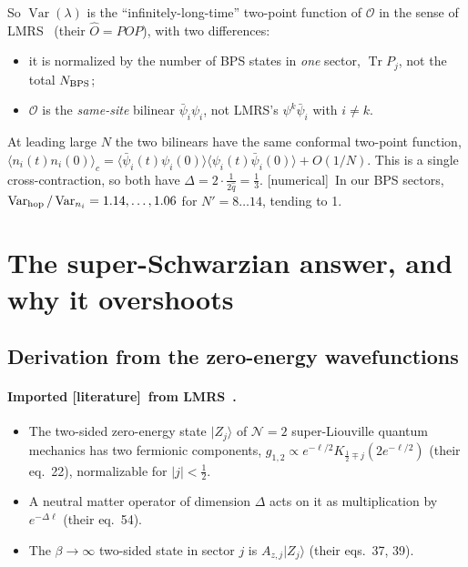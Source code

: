 \documentclass[11pt]{article}
\newcommand{\Tr}{\operatorname{Tr}}
\newcommand{\Var}{\operatorname{Var}}
\newcommand{\ket}[1]{\lvert #1\rangle}
\newcommand{\Np}{N'}
\newcommand{\tagbox}[2]{\textsf{\small\color{#1}[#2]}}
\newcommand{\EST}{\tagbox{cest}{literature}}
\newcommand{\NUM}{\tagbox{cnum}{numerical}}
\theoremstyle{remark}
\begin{document}
So $\Var(\lambda)$ is the ``infinitely-long-time'' two-point function of $\mathcal O$ in the sense of
LMRS~\cite{LMRS} (their $\hat O=POP$), with two differences:
\begin{itemize}\itemsep1pt
\item it is normalized by the number of BPS states in \emph{one} sector, $\Tr P_j$, not the total $N_{\rm BPS}$;
\item $\mathcal O$ is the \emph{same-site} bilinear $\bar\psi_i\psi_i$, not LMRS's $\psi^k\bar\psi_i$ with $i\neq k$.
\end{itemize}
At leading large $N$ the two bilinears have the same conformal two-point function,
$\langle n_i(t)n_i(0)\rangle_c=\langle\bar\psi_i(t)\psi_i(0)\rangle\langle\psi_i(t)\bar\psi_i(0)\rangle+O(1/N)$. This is
a single cross-contraction, so both have $\Delta=2\cdot\frac1{2\hat q}=\frac13$. \NUM\ In our BPS sectors,
$\Var_{\rm hop}/\Var_{n_i}=1.14,\ldots,1.06$ for $\Np=8\ldots14$, tending to 1.

\section{The super-Schwarzian answer, and why it overshoots}\label{sec:lmrs}

\subsection{Derivation from the zero-energy wavefunctions}\label{sec:mellin}
\paragraph{Imported \EST\ from LMRS~\cite{LMRS}.}
\begin{itemize}\itemsep1pt
\item The two-sided zero-energy state $\ket{Z_j}$ of $\mathcal N{=}2$ super-Liouville quantum mechanics has two fermionic
  components, $g_{1,2}\propto e^{-\ell/2}K_{\frac12\mp j}(2e^{-\ell/2})$ (their eq.~22), normalizable for $|j|<\frac12$.
\item A neutral matter operator of dimension $\Delta$ acts on it as multiplication by $e^{-\Delta\ell}$ (their eq.~54).
\item The $\beta\to\infty$ two-sided state in sector $j$ is $A_{z,j}\ket{Z_j}$ (their eqs.~37, 39).
\end{itemize}
\end{document}
